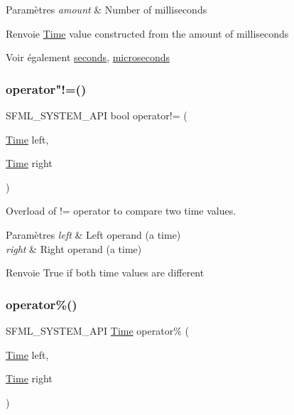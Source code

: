 \begin{DoxyParams}{Paramètres}
{\em amount} & Number of milliseconds\\
\hline
\end{DoxyParams}
\begin{DoxyReturn}{Renvoie}
\hyperlink{classsf_1_1Time}{Time} value constructed from the amount of milliseconds
\end{DoxyReturn}
\begin{DoxySeeAlso}{Voir également}
\hyperlink{classsf_1_1Time_ae36b9ef700f0ed0516abf0194ceb546b}{seconds}, \hyperlink{classsf_1_1Time_a951fd7219641f1e8191887f5dfe0dc31}{microseconds} 
\end{DoxySeeAlso}
\mbox{\label{classsf_1_1Time_ae06b561f6422ec8ca414d400efd2cf4b}} 
\subsubsection{\texorpdfstring{operator"!=()}{operator!=()}}
{\footnotesize\ttfamily S\+F\+M\+L\+\_\+\+S\+Y\+S\+T\+E\+M\+\_\+\+A\+PI bool operator!= (\begin{DoxyParamCaption}\item[{\hyperlink{classsf_1_1Time}{Time}}]{left,  }\item[{\hyperlink{classsf_1_1Time}{Time}}]{right }\end{DoxyParamCaption})\hspace{0.3cm}{\ttfamily [related]}}



Overload of != operator to compare two time values. 


\begin{DoxyParams}{Paramètres}
{\em left} & Left operand (a time) \\
\hline
{\em right} & Right operand (a time)\\
\hline
\end{DoxyParams}
\begin{DoxyReturn}{Renvoie}
True if both time values are different 
\end{DoxyReturn}
\mbox{\label{classsf_1_1Time_aafb8b12fb0ac0e366d6ea9c9e9f93335}} 
\subsubsection{\texorpdfstring{operator\%()}{operator\%()}}
{\footnotesize\ttfamily S\+F\+M\+L\+\_\+\+S\+Y\+S\+T\+E\+M\+\_\+\+A\+PI \hyperlink{classsf_1_1Time}{Time} operator\% (\begin{DoxyParamCaption}\item[{\hyperlink{classsf_1_1Time}{Time}}]{left,  }\item[{\hyperlink{classsf_1_1Time}{Time}}]{right }\end{DoxyParamCaption})\hspace{0.3cm}{\ttfamily [related]}}




